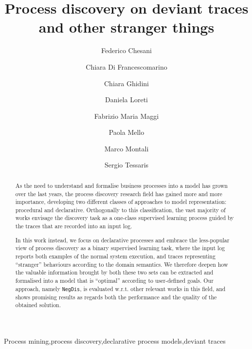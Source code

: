 \documentclass[review]{elsarticle}
\theoremstyle{definition}
\theoremstyle{plain}
\newcommand{\nd}{\texttt{NegDis}\xspace}
\begin{document}
\begin{frontmatter}

\title{Process discovery on deviant traces and other stranger things}

\author[disi]{Federico Chesani}
\author[fbk]{Chiara Di Francescomarino}
\author[fbk]{Chiara Ghidini}
\author[disi]{Daniela Loreti}

\author[unibz]{Fabrizio Maria Maggi}
\author[disi]{Paola Mello}
\author[unibz]{Marco Montali}
\author[unibz]{Sergio Tessaris}

\address[disi]{DISI - University of Bologna, Italy}
\address[fbk]{Fondazione Bruno Kessler, Trento, Italy}
\address[unibz]{Free University of Bozen/Bolzano, Italy}




\begin{abstract}
As the need to understand and formalise business processes into a model has grown over the last years, 
the process discovery research field has gained more and more importance, developing two different classes of approaches to model representation: procedural and declarative. 
%
Orthogonally to this classification, the vast majority of works envisage the discovery task as a one-class supervised learning process guided by the traces that are recorded into an input log. 

In this work instead, we focus on declarative processes and embrace the less-popular view of process discovery as a binary supervised learning task, where the input log reports both examples of the normal system execution, and traces representing ``stranger'' behaviours according to the domain semantics. We therefore deepen how the valuable information brought by both these two sets can be extracted and formalised into a model that is ``optimal'' according to user-defined goals. Our approach, namely \nd, is evaluated w.r.t. other relevant works in this field, and shows promising results as regards both the performance and the quality of the obtained solution.
\end{abstract}

\begin{keyword}
Process mining\sep process discovery\sep declarative process models\sep deviant traces
\end{keyword}

\end{frontmatter}

\linenumbers


%




%







\end{document}
